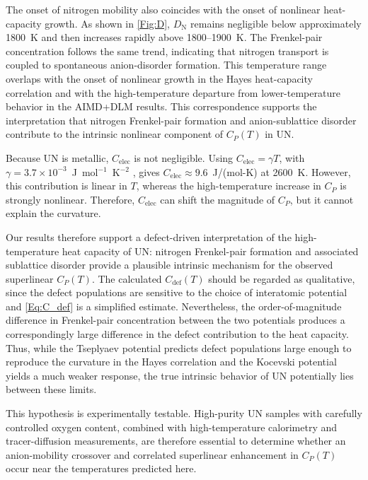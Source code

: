 \documentclass[preprint,12pt,sort&compress]{elsarticle}
\newcommand{\?}{\stackrel{?}{=}}
\begin{document}
The onset of nitrogen mobility also coincides with the onset of nonlinear heat-capacity growth. As shown in \cref{Fig:D}, $D_\mathrm{N}$ remains negligible below approximately 1800~K and then increases rapidly above 1800--1900~K. The Frenkel-pair concentration follows the same trend, indicating that nitrogen transport is coupled to spontaneous anion-disorder formation. This temperature range overlaps with the onset of nonlinear growth in the Hayes heat-capacity correlation and with the high-temperature departure from lower-temperature behavior in the AIMD+DLM results. This correspondence supports the interpretation that nitrogen Frenkel-pair formation and anion-sublattice disorder contribute to the intrinsic nonlinear component of $C_P(T)$ in UN.

Because UN is metallic, $C_{\mathrm{elec}}$ is not negligible. Using $C_{\mathrm{elec}}=\gamma T$, with $\gamma=3.7\times10^{-3}$~J~mol$^{-1}$~K$^{-2}$ \cite{Samsel2007}, gives $C_{\mathrm{elec}}\approx 9.6$~J/(mol-K) at 2600~K. However, this contribution is linear in $T$, whereas the high-temperature increase in $C_P$ is strongly nonlinear. Therefore, $C_{\mathrm{elec}}$ can shift the magnitude of $C_P$, but it cannot explain the curvature. 

Our results therefore support a defect-driven interpretation of the high-temperature heat capacity of UN: nitrogen Frenkel-pair formation and associated sublattice disorder provide a plausible intrinsic mechanism for the observed superlinear $C_P(T)$. The calculated $C_{\mathrm{def}}(T)$ should be regarded as qualitative, since the defect populations are sensitive to the choice of interatomic potential and \cref{Eq:C_def} is a simplified estimate. Nevertheless, the order-of-magnitude difference in Frenkel-pair concentration between the two potentials produces a correspondingly large difference in the defect contribution to the heat capacity. Thus, while the Tseplyaev potential predicts defect populations large enough to reproduce the curvature in the Hayes correlation and the Kocevski potential yields a much weaker response, the true intrinsic behavior of UN potentially lies between these limits.

This hypothesis is experimentally testable. High-purity UN samples with carefully controlled oxygen content, combined with high-temperature calorimetry and tracer-diffusion measurements, are therefore essential to determine whether an anion-mobility crossover and correlated superlinear enhancement in $C_P(T)$ occur near the temperatures predicted here.
\end{document}
